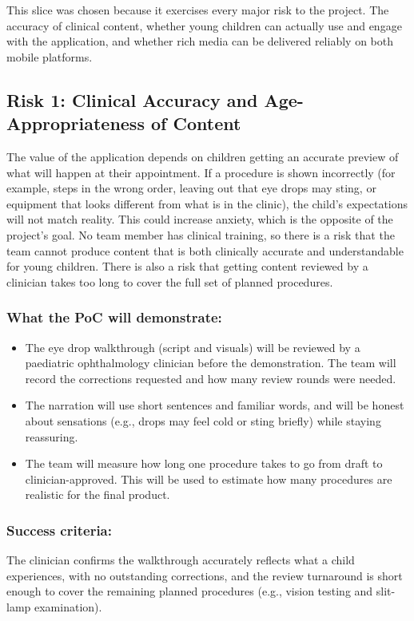 \documentclass{article}
\begin{document}
\noindent This slice was chosen because it exercises every major risk to the project.
The accuracy of clinical content, whether young children can actually use and
engage with the application, and whether rich media can be delivered reliably
on both mobile platforms.

\subsection{Risk 1: Clinical Accuracy and Age-Appropriateness of Content}

The value of the application depends on children getting an accurate preview of
what will happen at their appointment. If a procedure is shown incorrectly (for
example, steps in the wrong order, leaving out that eye drops may sting, or
equipment that looks different from what is in the clinic), the child's
expectations will not match reality. This could increase anxiety, which is the
opposite of the project's goal. No team member has clinical training, so there
is a risk that the team cannot produce content that is both clinically accurate
and understandable for young children. There is also a risk that getting
content reviewed by a clinician takes too long to cover the full set of planned
procedures.

\subsubsection*{What the PoC will demonstrate:}
\begin{itemize}
  \item The eye drop walkthrough (script and visuals) will be reviewed by a
  paediatric ophthalmology clinician before the demonstration. The team will
  record the corrections requested and how many review rounds were needed.
  \item The narration will use short sentences and familiar words, and will be
  honest about sensations (e.g., drops may feel cold or sting briefly) while
  staying reassuring.
  \item The team will measure how long one procedure takes to go from draft to
  clinician-approved. This will be used to estimate how many procedures are
  realistic for the final product.
\end{itemize}

\subsubsection*{Success criteria:}
The clinician confirms the walkthrough accurately
reflects what a child experiences, with no outstanding corrections, and the
review turnaround is short enough to cover the remaining planned procedures
(e.g., vision testing and slit-lamp examination).
\end{document}
